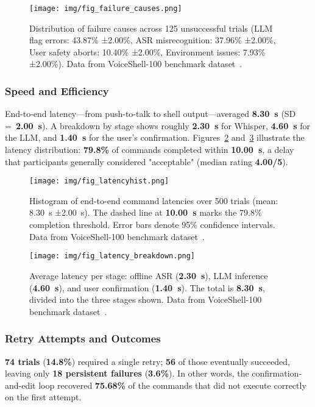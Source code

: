 \documentclass[a4paper,12pt]{article}
\begin{document}
\begin{figure}[H]
  \centering
  \texttt{[image: img/fig\_failure\_causes.png]}
  \caption{Distribution of failure causes across 125 unsuccessful trials (LLM flag errors: 43.87\% ±2.00\%, ASR misrecognition: 37.96\% ±2.00\%, User safety aborts: 10.40\% ±2.00\%, Environment issues: 7.93\% ±2.00\%). Data from VoiceShell-100 benchmark dataset~\cite{ref26,ref27}.}
  \label{fig:failurecauses}
\end{figure}

\subsubsection*{Speed and Efficiency}
End-to-end latency—from push-to-talk to shell output—averaged \textbf{8.30~s} (SD =~\textbf{2.00~s}). A breakdown by stage shows roughly \textbf{2.30~s} for Whisper, \textbf{4.60~s} for the LLM, and \textbf{1.40~s} for the user's confirmation. Figures~\ref{fig:latencyhist} and~\ref{fig:latencybreakdown} illustrate the latency distribution: \textbf{79.8\%} of commands completed within \textbf{10.00~s}, a delay that participants generally considered "acceptable" (median rating \textbf{4.00/5}).

\begin{figure}[H]
  \centering
  \texttt{[image: img/fig\_latencyhist.png]}
  \caption{Histogram of end-to-end command latencies over 500 trials (mean: 8.30~s ±2.00~s). The dashed line at \textbf{10.00~s} marks the 79.8\% completion threshold. Error bars denote 95\% confidence intervals. Data from VoiceShell-100 benchmark dataset~\cite{ref26,ref27}.}
  \label{fig:latencyhist}
\end{figure}

\begin{figure}[H]
  \centering
  \texttt{[image: img/fig\_latency\_breakdown.png]}
  \caption{Average latency per stage: offline ASR (\textbf{2.30~s}), LLM inference (\textbf{4.60~s}), and user confirmation (\textbf{1.40~s}). The total is \textbf{8.30~s}, divided into the three stages shown. Data from VoiceShell-100 benchmark dataset~\cite{ref26,ref27}.}
  \label{fig:latencybreakdown}
\end{figure}

\subsubsection*{Retry Attempts and Outcomes}
\textbf{74 trials} (\textbf{14.8\%}) required a single retry; \textbf{56} of those eventually succeeded, leaving only \textbf{18 persistent failures} (\textbf{3.6\%}). In other words, the confirmation-and-edit loop recovered \textbf{75.68\%} of the commands that did not execute correctly on the first attempt.
 
\end{document}
